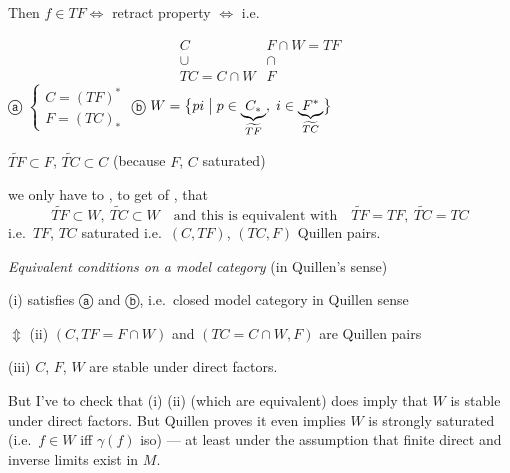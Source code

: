 \documentclass[11pt,a4paper]{article}
\begin{document}
Then $f \in TF \Longleftrightarrow$ retract property $\Longleftrightarrow$
i.e.

\[
  \begin{array}{cc}
    C & F \cap W = TF \\
    \cup & \cap \\
    TC = C \cap W & F
  \end{array}
\]
ⓐ $\begin{cases} C = (TF)^* \\ F = (TC)_* \end{cases}$
\qquad ⓑ $W = \bigl\{ pi \bigm| p \in \underbrace{C_*}_{\widetilde{TF}},\;
i \in \underbrace{F^*}_{\widetilde{TC}} \bigr\}$

$\widetilde{TF} \subset F$, $\widetilde{TC} \subset C$ (because $F$, $C$
 saturated)


we only have to  , to get \ill{} of
\ill{}, that
\[
  \boxed{\widetilde{TF} \subset W,\ \widetilde{TC} \subset W}
  \quad \text{and this is equivalent with} \quad
  \boxed{\widetilde{TF} = TF,\ \widetilde{TC} = TC}
\]
i.e.\ $TF$, $TC$ saturated i.e.\ $(C, TF)$, $(TC, F)$ Quillen pairs.

\emph{Equivalent conditions on a model category} (in Quillen's sense)

(i) satisfies ⓐ and ⓑ, i.e.\ closed model category in Quillen sense

$\Updownarrow$ (ii) $(C, TF = F \cap W)$ and $(TC = C \cap W, F)$ are Quillen
pairs

(iii) $C$, $F$, $W$ are stable under direct factors.

But I've to check that (i) (ii) (which are equivalent) does imply that
\emph{$W$} is stable under direct factors. But Quillen proves it even
implies $W$ is strongly saturated (i.e.\ $f \in W$ iff $\gamma(f)$ iso)
— at least under the assumption that finite direct and inverse limits exist
in $M$.


\end{document}
